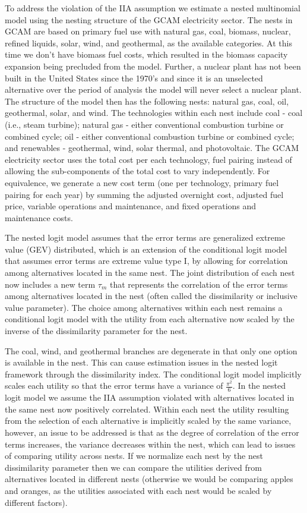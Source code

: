 \documentclass[10pt]{amsart}
\begin{document}
To address the violation of the IIA assumption we estimate a nested multinomial model using the nesting structure of the GCAM electricity sector.
The nests in GCAM are based on primary fuel use with natural gas, coal, biomass, nuclear, refined liquids, solar, wind, and geothermal, as the available categories.
At this time we don't have biomass fuel costs, which resulted in the biomass capacity expansion being precluded from the model.
Further, a nuclear plant has not been built in the United States since the 1970's and since it is an unselected  alternative over the period of analysis the model will never select a nuclear plant. 
The structure of the model then has the following nests: natural gas, coal, oil, geothermal, solar, and wind. 
The technologies within each nest include coal - coal (i.e., steam turbine); natural gas - either conventional combustion turbine or combined cycle; oil - either conventional combustion turbine or combined cycle; and renewables - geothermal, wind, solar thermal, and photovoltaic. 
The GCAM electricity sector uses the total cost per each technology, fuel pairing instead of allowing the sub-components of the total cost to vary independently.
For equivalence, we generate a new cost term (one per technology, primary fuel pairing for each year) by summing the adjusted overnight cost, adjusted fuel price, variable operations and maintenance, and fixed operations and maintenance costs.

The nested logit model assumes that the error terms are generalized extreme value (GEV) distributed, which is an extension of the conditional logit model that assumes error terms are extreme value type I, by allowing for correlation among alternatives located in the same nest. 
The joint distribution of each nest now includes a new term $\tau_m$ that represents the correlation of the error terms among alternatives located in the nest (often called the dissimilarity or inclusive value parameter). 
The choice among alternatives within each nest remains a conditional logit model with the utility from each alternative now scaled by the inverse of the dissimilarity parameter for the nest.  

The coal, wind, and geothermal branches are degenerate in that only one option is available in the nest.
This can cause estimation issues in the nested logit framework through the dissimilarity index.
The conditional logit model implicitly scales each utility so that the error terms have a variance of $\frac{\pi^2}{6}$.
In the nested logit model we assume the IIA assumption violated with alternatives located in the same nest now positively correlated.
Within each nest the utility resulting from the selection of each alternative is implicitly scaled by the same variance, however, an issue to be addressed is that as the degree of correlation of the error terms increases, the variance decreases within the nest, which can lead to issues of comparing utility across nests.
If we normalize each nest by the nest dissimilarity parameter then we can compare the utilities derived from alternatives located in different nests (otherwise we would be comparing apples and oranges, as the utilities associated with each nest would be scaled by different factors)\parencite{heiss2002structural}.
\end{document}
